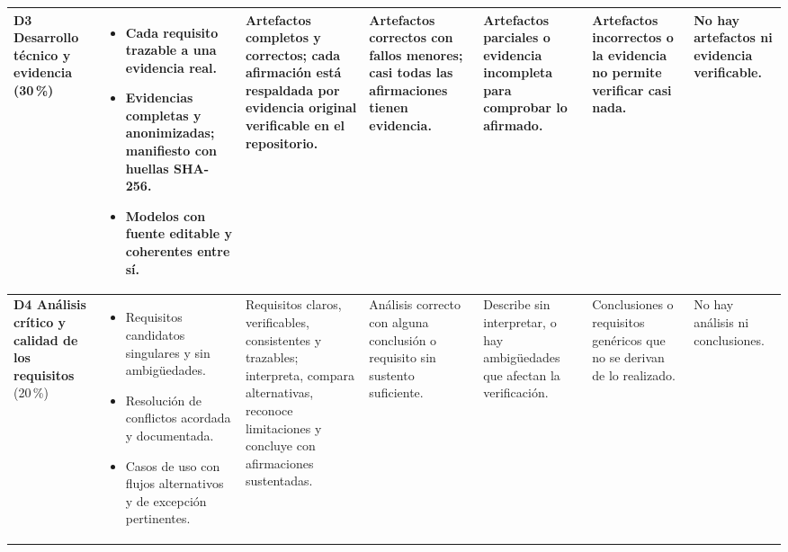 \documentclass[11pt]{article}
\begin{document}
\begin{landscape}
{\begin{longtable}{|L{2.4cm}|L{5.6cm}|L{3.1cm}|L{2.8cm}|L{2.8cm}|L{2.7cm}|L{2.1cm}|}
	\hline
	\textbf{D3 Desarrollo técnico y evidencia} (30\,\%) & \begin{itemize}[leftmargin=9pt,itemsep=0pt,topsep=0pt,parsep=0pt,partopsep=0pt,after=\vspace{-\baselineskip}]\item Cada requisito trazable a una evidencia real.\item Evidencias completas y anonimizadas; manifiesto con huellas SHA-256.\item Modelos con fuente editable y coherentes entre sí.\end{itemize} & Artefactos completos y correctos; cada afirmación está respaldada por evidencia original verificable en el repositorio. & Artefactos correctos con fallos menores; casi todas las afirmaciones tienen evidencia. & Artefactos parciales o evidencia incompleta para comprobar lo afirmado. & Artefactos incorrectos o la evidencia no permite verificar casi nada. & No hay artefactos ni evidencia verificable.\\
	\hline
	\textbf{D4 Análisis crítico y calidad de los requisitos} (20\,\%) & \begin{itemize}[leftmargin=9pt,itemsep=0pt,topsep=0pt,parsep=0pt,partopsep=0pt,after=\vspace{-\baselineskip}]\item Requisitos candidatos singulares y sin ambigüedades.\item Resolución de conflictos acordada y documentada.\item Casos de uso con flujos alternativos y de excepción pertinentes.\end{itemize} & Requisitos claros, verificables, consistentes y trazables; interpreta, compara alternativas, reconoce limitaciones y concluye con afirmaciones sustentadas. & Análisis correcto con alguna conclusión o requisito sin sustento suficiente. & Describe sin interpretar, o hay ambigüedades que afectan la verificación. & Conclusiones o requisitos genéricos que no se derivan de lo realizado. & No hay análisis ni conclusiones.\\
	\hline

\end{longtable}}
\end{landscape}
\end{document}
